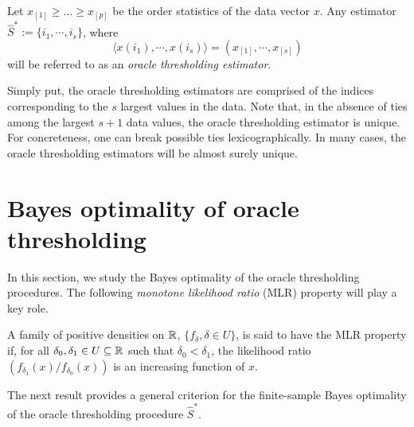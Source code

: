 \begin{definition} Let $x_{[1]} \ge \ldots \ge x_{[p]}$ be the order statistics of
the data vector $x$.  Any estimator $\widehat{S}^* :=\{ i_1,\cdots,i_s\}$, where
 $$
  \langle x(i_1),\cdots,x(i_s)\rangle  = (x_{[1]},\cdots,x_{[s]})
 $$ 
 will be referred to as an {\em oracle thresholding estimator}.
 \end{definition}
 
 Simply put, the oracle thresholding estimators are comprised of the indices corresponding to the $s$ largest values in the
 data.  Note that, in the absence of ties among the largest $s+1$ data values, the oracle thresholding estimator is unique.  
 For concreteness,  one can break possible ties lexicographically.  In many cases, 
 the oracle thresholding estimators will be almost surely unique.



\section{Bayes optimality of oracle thresholding} %
\label{subsec:optimal-procedure-sub-exponential}

In this section, we study the Bayes optimality of the oracle thresholding procedures.  
The following \emph{monotone likelihood ratio} (MLR) property will play a key role.

\begin{definition}
A family of positive densities on $\mathbb R$, $\{f_\delta, \delta \in U\}$, is said to have the MLR property if, for all $\delta_0, \delta_1\in U\subseteq\mathbb R$ such that $\delta_0 < \delta_1$, the likelihood ratio $\left(f_{\delta_1}(x)/f_{\delta_0}(x)\right)$ is an increasing function of $x$.
\end{definition}

The next result provides a general criterion for the finite-sample Bayes optimality of the oracle thresholding 
procedure $\widehat{S}^*$.

